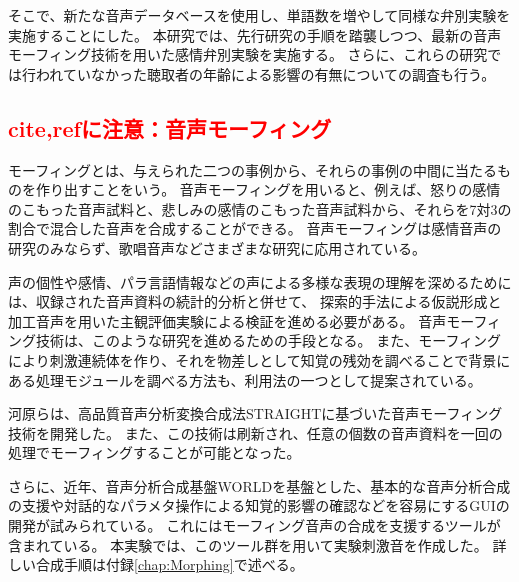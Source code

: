 そこで、新たな音声データベースを使用し、単語数を増やして同様な弁別実験を実施することにした。
本研究では、先行研究\cite{hanatani2023Emo}の手順を踏襲しつつ、最新の音声モーフィング技術\cite{kawahara2024interactive}を用いた感情弁別実験を実施する。
さらに、これらの研究では行われていなかった聴取者の年齢による影響の有無についての調査も行う。



\subsection{\textcolor{red}{cite,refに注意：音声モーフィング}}
\label{sec:morphing}
モーフィングとは、与えられた二つの事例から、それらの事例の中間に当たるものを作り出すことをいう。
音声モーフィングを用いると、例えば、怒りの感情のこもった音声試料と、悲しみの感情のこもった音声試料から、それらを7対3の割合で混合した音声を合成することができる。
音声モーフィングは感情音声の研究のみならず、歌唱音声などさまざまな研究に応用されている\cite{kawahara2009tandem}。

声の個性や感情、パラ言語情報などの声による多様な表現の理解を深めるためには、収録された音声資料の続計的分析と併せて、
探索的手法による仮説形成と加工音声を用いた主観評価実験による検証を進める必要がある。
音声モーフィング技術は、このような研究を進めるための手段となる。
また、モーフィングにより刺激連続体を作り、それを物差しとして知覚の残効を調べることで背景にある処理モジュールを調べる方法も、利用法の一つとして提案されている。

河原らは、高品質音声分析変換合成法STRAIGHT\cite{kawahara1999restructuring}に基づいた音声モーフィング技術を開発した\cite{matsui2003STRAIGHT}。
また、この技術は刷新され、任意の個数の音声資料を一回の処理でモーフィングすることが可能となった\cite{kawahara2013morph,kawahara2014morph}。

さらに、近年、音声分析合成基盤WORLD\cite{morise2016world}を基盤とした、基本的な音声分析合成の支援や対話的なパラメタ操作による知覚的影響の確認などを容易にするGUIの開発が試みられている\cite{kawahara2024interactive}。
これにはモーフィング音声の合成を支援するツールが含まれている。
本実験では、このツール群を用いて実験刺激音を作成した。
詳しい合成手順は付録\ref{chap:Morphing}で述べる。



